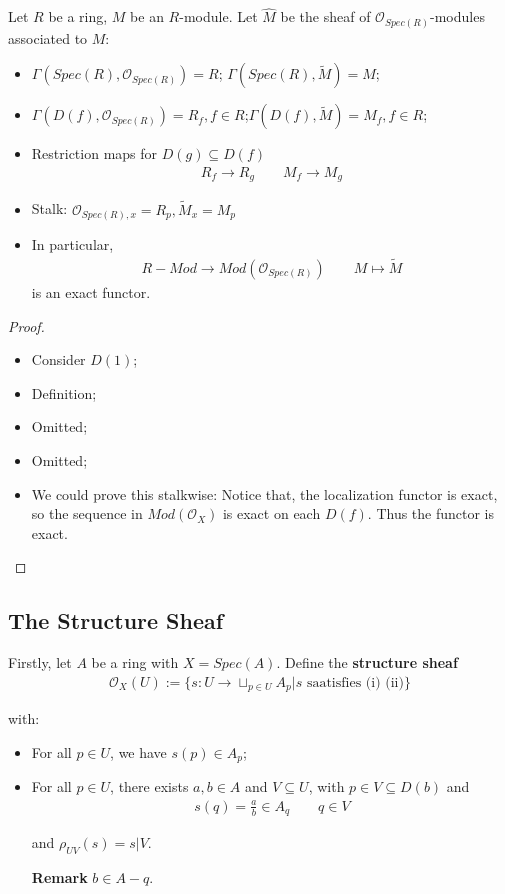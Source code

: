 \documentclass[Total.tex]{subfiles}
\begin{document}
			\begin{lemma}
				Let $R$ be a ring, $M$ be an $R$-module. Let $\hat{M}$ be the sheaf of $\mathcal{O}_{Spec(R)}$-modules associated to $M$:
				
				\begin{itemize}
					\item $\Gamma(Spec(R),\mathcal{O}_{Spec(R)})=R$;  $\Gamma(Spec(R),\tilde{M})=M$;
					\item $\Gamma(D(f),\mathcal{O}_{Spec(R)})=R_f,f\in R$;$\Gamma(D(f),\tilde{M})=M_f,f\in R$;
					\item Restriction maps for $D(g)\subseteq D(f)$
					\begin{gather*}
						R_f\rightarrow R_g\qquad M_f\rightarrow M_g
					\end{gather*}
					\item Stalk: $\mathcal{O}_{Spec(R),x}=R_p,\tilde{M}_{x}=M_p$
					\item 	In particular,
					\begin{gather*}
						R-Mod\rightarrow Mod(\mathcal{O}_{Spec(R)})\qquad M\mapsto \tilde{M}
					\end{gather*}
					is an exact functor.
				\end{itemize}
			\end{lemma}
			\begin{proof}
				\begin{itemize}
					\item Consider $D(1)$;
					\item Definition;
					\item Omitted;
					\item Omitted;
					\item We could prove this stalkwise: Notice that, the localization functor is exact, so the sequence in $Mod(\mathcal{O}_X)$ is exact on each $D(f)$. Thus the functor is exact.
				\end{itemize}
			\end{proof}
			\subsection{The Structure Sheaf}
			\begin{Def}
				Firstly, let $A$ be a ring with $X=Spec(A)$. Define the \textbf{structure sheaf
				\begin{gather*}
					\mathcal{O}_X(U):=\{s:U\rightarrow \sqcup_{p\in U} A_p|s\mbox{ saatisfies (i) (ii)}\}
				\end{gather*}}
				
				with:
				\begin{itemize}
					\item For all $p\in U$, we have $s(p)\in A_p$;
					\item For all $p\in U$, there exists $a,b\in A$ and $V\subseteq U$, with $p\in V\subseteq D(b)$ and
					\begin{gather*}
						s(q)=\frac{a}{b}\in A_q\qquad q\in V
					\end{gather*}
					
					and $\rho_{UV}(s)=s|V$.
					
					\textbf{Remark} $b\in A-q$.
				\end{itemize}
			\end{Def}
			
\end{document}
